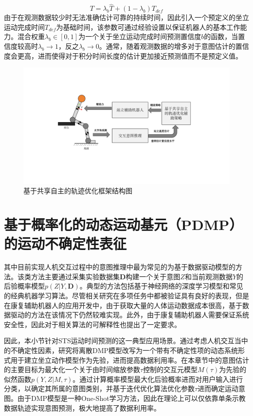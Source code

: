 \begin{equation}
    T=\lambda_b \hat T + (1-\lambda_b)T_{def}
    \label{eq:4-6}
\end{equation}
由于在观测数据较少时无法准确估计可靠的持续时间，因此引入一个预定义的坐立运动完成时间$T_{def}$为基础时间，该参数可通过经验设置以保证机器人的基本工作能力。混合权重$\lambda_b \in [0,1]$为一个关于坐立运动完成时间预测置信度$b$的函数，当置信度较高时$\lambda_b \rightarrow 1$，反之$\lambda_b \rightarrow 0$。通常，随着观测数据的增多对于意图估计的置信度会更高，进而使得对于积分时间长度的估计更加接近预测值而不是预定义值。

\begin{figure}[htb]
    \centering\includegraphics[width=1\textwidth]{figures/4-Fig-2.pdf}
    \caption{基于共享自主的轨迹优化框架结构图}
    \label{fig:4-2}
\end{figure}

\section{基于概率化的动态运动基元（PDMP）的运动不确定性表征} 
其中目前实现人机交互过程中的意图推理中最为常见的为基于数据驱动模型的方法。该类方法主要通过采集实验数据集$\mathbf{D}$构建一个关于意图$Z$和当前观测数据$Y$的后验概率模型$p(Z|Y,\mathbf{D})$。典型的方法包括基于神经网络的深度学习模型和常见的经典机器学习算法。尽管相关研究在多项任务中都被验证具有良好的表现，但是在康复辅助机器人的应用开发中，由于获取大量的人体运动数据成本很高，基于数据驱动的方法在该情况下仍然较难实现。此外，由于康复辅助机器人需要保证系统安全性，因此对于相关算法的可解释性也提出了一定要求。

因此，本小节针对STS运动时间预测的这一典型应用场景。通过考虑人机交互当中的不确定性因素，研究将离散DMP模型改写为一个带有不确定性项的动态系统形式用于建立坐立动作模型作为先验，进而提高数据利用率。在本章节中的意图估计的主要目标为最大化一个关于由时间缩放参数$\tau$控制的交互元模型$M(\tau)$为先验的似然函数$p(Y,Z|M,\tau)$。通过计算概率模型最大化后验概率进而对用户输入进行分类，以确定其所属的意图类别，并基于迭代优化算法优化参数$\tau$进而确定运动意图。由于DMP模型是一种One-Shot学习方法，因此在理论上可以仅依靠单条示教数据轨迹实现意图预测，极大地提高了数据利用率。


